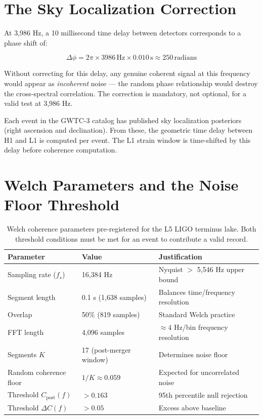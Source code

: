 \documentclass[11pt, letterpaper, openany]{book}
\begin{document}
\section*{The Sky Localization Correction}

At 3,986 Hz, a 10 millisecond time delay between detectors corresponds
to a phase shift of:

\begin{equation}
\Delta\phi = 2\pi \times 3986\,\text{Hz} \times 0.010\,\text{s} \approx 250\,\text{radians}
\end{equation}

Without correcting for this delay, any genuine coherent signal at this
frequency would appear as \emph{incoherent} noise --- the random phase
relationship would destroy the cross-spectral correlation. The correction
is mandatory, not optional, for a valid test at 3,986 Hz.

Each event in the GWTC-3 catalog has published sky localization
posteriors (right ascension and declination). From these, the geometric
time delay between H1 and L1 is computed per event. The L1 strain
window is time-shifted by this delay before coherence computation.

\section*{Welch Parameters and the Noise Floor Threshold}

\begin{table}[H]
\centering
\renewcommand{\arraystretch}{1.4}
\small
\begin{tabular}{|l|l|l|}
\hline
\rowcolor{kishblue!10}
\textbf{Parameter} & \textbf{Value} & \textbf{Justification} \\
\hline\hline
Sampling rate ($f_s$) & 16,384 Hz & Nyquist $>$ 5,546 Hz upper bound \\
Segment length & 0.1 s (1,638 samples) & Balances time/frequency resolution \\
Overlap & 50\% (819 samples) & Standard Welch practice \\
FFT length & 4,096 samples & $\approx 4$ Hz/bin frequency resolution \\
Segments $K$ & 17 (post-merger window) & Determines noise floor \\
Random coherence floor & $1/K \approx 0.059$ & Expected for uncorrelated noise \\
Threshold $C_{\text{post}}(f)$ & $> 0.163$ & 95th percentile null rejection \\
Threshold $\Delta C(f)$ & $> 0.05$ & Excess above baseline \\
\hline
\end{tabular}
\caption{Welch coherence parameters pre-registered for the L5 LIGO terminus lake.
Both threshold conditions must be met for an event to contribute a valid record.}
\end{table}
\end{document}
